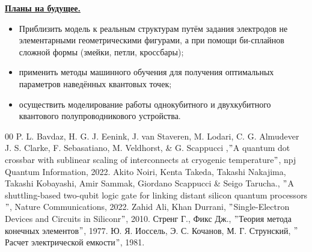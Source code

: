 \documentclass[a4paper,12pt]{report} %
\begin{document}
\textbf{\underline{Планы на будущее.}}
\begin{itemize}
    \item Приблизить модель к реальным структурам путём задания электродов не элементарными геометрическими фигурами, а при помощи би-сплайнов сложной формы (змейки, петли, кроссбары);
\item применить методы машинного обучения для получения оптимальных параметров наведённых квантовых точек;
\item осуществить моделирование работы однокубитного и двухкубитного квантового полупроводникового устройства.
\end{itemize}
\begin{thebibliography}{00}
 P. L. Bavdaz, H. G. J. Eenink, J. van Staveren, M. Lodari, C. G. Almudever J. S. Clarke, F. Sebasatiano, M. Veldhorst, & G. Scappucci ,$"$A quantum dot crossbar with sublinear scaling of interconnects at cryogenic temperature$"$, npj Quantum Information, 2022.
 Akito Noiri, Kenta Takeda, Takashi Nakajima, Takashi Kobayashi, Amir Sammak, Giordano Scappucci & Seigo Tarucha., $"$A shuttling-based two-qubit logic gate for linking distant silicon quantum processors$"$,
Nature Communications, 2022.
 Zahid Ali, Khan Durrani, $"$Single-Electron Devices and Circuits in Siliconr$"$, 2010.
  Стренг Г., Фикс Дж., $"$Теория метода конечных элементов$"$,  1977.
 Ю. Я. Иоссель, Э. С. Кочанов, М. Г. Струнский, $"$Расчет электрической емкости$"$, 1981.
\end{thebibliography}
\end{document}
